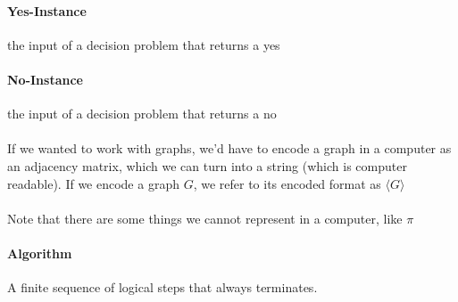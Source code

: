 \documentclass[12pt]{article}
\begin{document}
\paragraph{Yes-Instance} the input of a decision problem that returns a yes

\paragraph{No-Instance} the input of a decision problem that returns a no
\\
\\
If we wanted to work with graphs, we'd have to encode a graph in a computer as an adjacency matrix, which we can turn into a string (which is computer readable). If we encode a graph $G$, we refer to its encoded format as $\langle G \rangle$
\\
\\
Note that there are some things we cannot represent in a computer, like $\pi$

\paragraph{Algorithm} A finite sequence of logical steps that always terminates.
\end{document}
